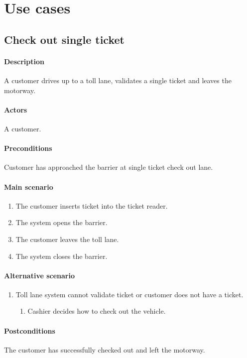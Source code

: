 \documentclass{report}
\begin{document}
\section{Use cases}
\subsection{Check out single ticket}
\paragraph{Description}
A customer drives up to a toll lane, validates a single ticket and leaves the motorway. 
\paragraph{Actors}
A customer.
\paragraph{Preconditions}
Customer has approached the barrier at single ticket check out lane. 
\paragraph{Main scenario}
\begin{enumerate}
\item The customer inserts ticket into the ticket reader.
\item The system opens the  barrier.
\item The customer leaves the toll lane.
\item The system closes the barrier.
\end{enumerate}
\paragraph{Alternative scenario}
\begin{enumerate}
\item Toll lane system cannot validate ticket or customer does not have a ticket.
\begin{enumerate}
\item Cashier decides how to check out the vehicle.
\end{enumerate}
\end{enumerate}
\paragraph{Postconditions}
The customer has successfully checked out and left the motorway.
\end{document}
